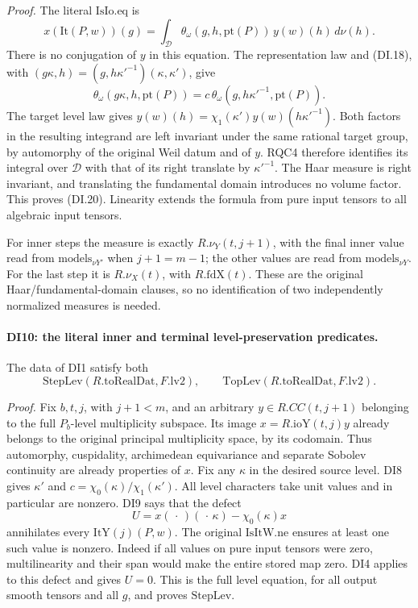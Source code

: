 \emph{Proof.}
The literal \(\mathrm{IsIo.eq}\) is
\[
 x(\mathrm{It}(P,w))(g)
   =\int_{\mathcal D}\theta_\omega(g,h,\mathrm{pt}(P))\,
                                      y(w)(h)\,d\nu(h).
 \tag{DI.21}
\]
There is no conjugation of \(y\) in this equation. The representation
law and (DI.18), with
\((g\kappa,h)=(g,h\kappa'^{-1})(\kappa,\kappa')\), give
\[
 \theta_\omega(g\kappa,h,\mathrm{pt}(P))
      =c\,\theta_\omega(g,h\kappa'^{-1},\mathrm{pt}(P)).
\]
The target level law gives
\(y(w)(h)=\chi_1(\kappa')y(w)(h\kappa'^{-1})\).
Both factors in the resulting integrand are left invariant under the
same rational target group, by automorphy of the original Weil datum
and of \(y\). RQC4 therefore identifies its integral over
\(\mathcal D\) with that of its right translate by
\(\kappa'^{-1}\). The Haar measure is right invariant, and translating
the fundamental domain introduces no volume factor. This proves
(DI.20). Linearity extends the formula from pure input tensors to
all algebraic input tensors.

For inner steps the measure is exactly \(R.\nu_Y(t,j+1)\), with
the final inner value read from \(\mathrm{models}_{\nu Y'}\) when
\(j+1=m-1\); the other values are read from
\(\mathrm{models}_{\nu Y}\). For the last step it is
\(R.\nu_X(t)\), with \(R.\mathrm{fdX}(t)\).
These are the original Haar/fundamental-domain clauses, so no
identification of two independently normalized measures is needed.

\paragraph{DI10: the literal inner and terminal level-preservation predicates.}
\label{claim:DI10}
The data of DI1 satisfy both
\[
 \mathrm{StepLev}(R.\mathrm{toRealDat},F.\mathrm{lv2}),\qquad
 \mathrm{TopLev}(R.\mathrm{toRealDat},F.\mathrm{lv2}).
 \tag{DI.22}
\]

\emph{Proof.}
Fix \(b,t,j\), with \(j+1<m\), and an arbitrary
\(y\in R.CC(t,j+1)\) belonging to the full \(P_b\)-level
multiplicity subspace. Its image \(x=R.\mathrm{ioY}(t,j)y\)
already belongs to the original principal multiplicity space, by its
codomain. Thus automorphy, cuspidality, archimedean equivariance and
separate Sobolev continuity are already properties of \(x\).
Fix any \(\kappa\) in the desired source level. DI8 gives
\(\kappa'\) and \(c=\chi_0(\kappa)/\chi_1(\kappa')\).
All level characters take unit values and in particular are nonzero.
DI9 says that the defect
\[
                     U=x(\,\cdot\,)(\,\cdot\,\kappa)
                                      -\chi_0(\kappa)x
\]
annihilates every \(\mathrm{ItY}(j)(P,w)\). The original
\(\mathrm{IsItW.ne}\) ensures at least one such value is nonzero.
Indeed if all values on pure input tensors were zero, multilinearity
and their span would make the entire stored map zero. DI4 applies
to this defect and gives \(U=0\). This is the full level equation,
for all output smooth tensors and all \(g\), and proves
\(\mathrm{StepLev}\).

